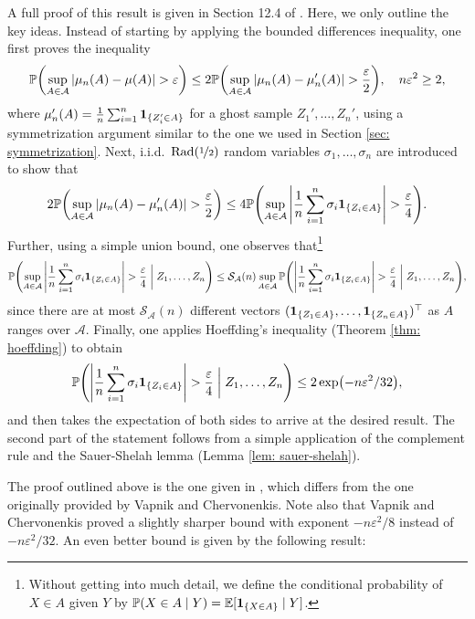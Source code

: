 A full proof of this result is given in Section 12.4 of \cite{devroye1996probabilistic}. Here, we only outline the key ideas. Instead of starting by applying the bounded differences inequality, one first proves the inequality
\[
    \P\left(\sup_{A \in \mathcal{A}} \abs{\mu_n(A) - \mu(A)} > \varepsilon\right) \leq 2 \P\left(\sup_{A \in \mathcal{A}} \abs{\mu_n(A) - \mu_n'(A)} > \frac{\varepsilon}{2}\right), \quad n \varepsilon^2 \geq 2,
\]
where $\mu_n'(A) = \frac{1}{n} \sum_{i=1}^n \mathbf{1}_{\{Z_i' \in A\}}$ for a ghost sample $Z_1', \dots, Z_n'$, using a symmetrization argument similar to the one we used in Section \ref{sec: symmetrization}. Next, i.i.d.\ $\operatorname{Rad}(\nicefrac{1}{2})$ random variables $\sigma_1, \dots, \sigma_n$ are introduced to show that
\[
    2 \P\left(\sup_{A \in \mathcal{A}} \abs{\mu_n(A) - \mu_n'(A)} > \frac{\varepsilon}{2}\right) \leq 4 \P\left(\sup_{A \in \mathcal{A}} \abs{\frac{1}{n} \sum_{i=1}^n \sigma_i \indSet{Z_i \in A}} > \frac{\varepsilon}{4}\right).
\]
Further, using a simple union bound, one observes that\footnote{Without getting into much detail, we define the conditional probability of $X \in A$ given $Y$ by $\P(X \in A \given Y) = \Exp[\indSet{X \in A} \given Y]$.}
\[
    \P\left(\sup_{A \in \mathcal{A}} \abs{\frac{1}{n} \sum_{i=1}^n \sigma_i \indSet{Z_i \in A}} > \frac{\varepsilon}{4} \given[\bigg] Z_1, \dots, Z_n\right) \leq \mathcal{S}_{\mathcal{A}}(n) \sup_{A \in \mathcal{A}} \P\left(\abs{\frac{1}{n} \sum_{i=1}^n \sigma_i \indSet{Z_i \in A}} > \frac{\varepsilon}{4} \given[\bigg] Z_1, \dots, Z_n\right),
\]
since there are at most $\mathcal{S}_{\mathcal{A}}(n)$ different vectors $(\indSet{Z_1 \in A}, \dots, \indSet{Z_n \in A})^{\top}$ as $A$ ranges over $\mathcal{A}$. Finally, one applies Hoeffding's inequality (Theorem \ref{thm: hoeffding}) to obtain
\[
    \P\left(\abs{\frac{1}{n} \sum_{i=1}^n \sigma_i \indSet{Z_i \in A}} > \frac{\varepsilon}{4} \given[\bigg] Z_1, \dots, Z_n\right) \leq 2 \exp(-n\varepsilon^2 / 32),
\]
and then takes the expectation of both sides to arrive at the desired result. The second part of the statement follows from a simple application of the complement rule and the Sauer-Shelah lemma (Lemma \ref{lem: sauer-shelah}).

The proof outlined above is the one given in \cite{devroye1996probabilistic}, which differs from the one originally provided  by Vapnik and Chervonenkis. Note also that Vapnik and Chervonenkis proved a slightly sharper bound with exponent $-n \varepsilon^2 / 8$ instead of $-n \varepsilon^2 / 32$. An even better bound is given by the following result:


